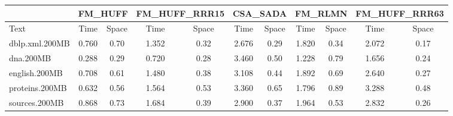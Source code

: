 \documentclass{article}
\begin{document}
\begin{center}

\begin{tabular}{|l|c|c|c|c|c|c|c|c|c|c|}
\hline &\multicolumn{2}{c|}{ FM\_HUFF } &\multicolumn{2}{c|}{ FM\_HUFF\_RRR15 } &\multicolumn{2}{c|}{ CSA\_SADA } &\multicolumn{2}{c|}{ FM\_RLMN } &\multicolumn{2}{c|}{ FM\_HUFF\_RRR63 } \\\hline
Text & Time & Space & Time & Space & Time & Space & Time & Space & Time & Space \\ 
\hline
\hline
dblp.xml.200MB & 0.760 & 0.70 & 1.352 & 0.32 & 2.676 & 0.29 & 1.820 & 0.34 & 2.072 & 0.17 \\ 
\hline
dna.200MB & 0.288 & 0.29 & 0.720 & 0.28 & 3.460 & 0.50 & 1.228 & 0.79 & 1.656 & 0.24 \\ 
\hline
english.200MB & 0.708 & 0.61 & 1.480 & 0.38 & 3.108 & 0.44 & 1.892 & 0.69 & 2.640 & 0.27 \\ 
\hline
proteins.200MB & 0.632 & 0.56 & 1.564 & 0.53 & 3.360 & 0.65 & 1.796 & 0.89 & 3.288 & 0.48 \\ 
\hline
sources.200MB & 0.868 & 0.73 & 1.684 & 0.39 & 2.900 & 0.37 & 1.964 & 0.53 & 2.832 & 0.26 \\ 
\hline
\end{tabular}


\end{center}
\end{document}
